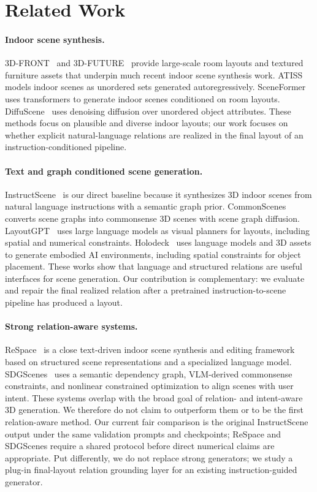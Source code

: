 \documentclass{egpubl}
\begin{document}
\section{Related Work}

\paragraph*{Indoor scene synthesis.}
3D-FRONT~\cite{fu20213dfront} and 3D-FUTURE~\cite{fu20203dfuture} provide large-scale room layouts and textured furniture assets that underpin much recent indoor scene synthesis work. ATISS~\cite{paschalidou2021atiss} models indoor scenes as unordered sets generated autoregressively. SceneFormer~\cite{wang2021sceneformer} uses transformers to generate indoor scenes conditioned on room layouts. DiffuScene~\cite{tang2024diffuscene} uses denoising diffusion over unordered object attributes. These methods focus on plausible and diverse indoor layouts; our work focuses on whether explicit natural-language relations are realized in the final layout of an instruction-conditioned pipeline.

\paragraph*{Text and graph conditioned scene generation.}
InstructScene~\cite{lin2024instructscene} is our direct baseline because it synthesizes 3D indoor scenes from natural language instructions with a semantic graph prior. CommonScenes~\cite{zhai2023commonscenes} converts scene graphs into commonsense 3D scenes with scene graph diffusion. LayoutGPT~\cite{feng2023layoutgpt} uses large language models as visual planners for layouts, including spatial and numerical constraints. Holodeck~\cite{yang2024holodeck} uses language models and 3D assets to generate embodied AI environments, including spatial constraints for object placement. These works show that language and structured relations are useful interfaces for scene generation. Our contribution is complementary: we evaluate and repair the final realized relation after a pretrained instruction-to-scene pipeline has produced a layout.

\paragraph*{Strong relation-aware systems.}
ReSpace~\cite{bucher2026respace} is a close text-driven indoor scene synthesis and editing framework based on structured scene representations and a specialized language model. SDGScenes~\cite{gao2026sdgscenes} uses a semantic dependency graph, VLM-derived commonsense constraints, and nonlinear constrained optimization to align scenes with user intent. These systems overlap with the broad goal of relation- and intent-aware 3D generation. We therefore do not claim to outperform them or to be the first relation-aware method. Our current fair comparison is the original InstructScene output under the same validation prompts and checkpoints; ReSpace and SDGScenes require a shared protocol before direct numerical claims are appropriate. Put differently, we do not replace strong generators; we study a plug-in final-layout relation grounding layer for an existing instruction-guided generator.
\end{document}

